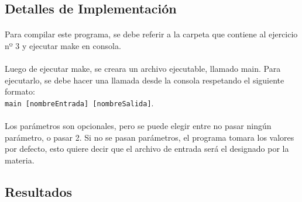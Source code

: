 \subsection{Detalles de Implementación}

\paragraph{}
Para compilar este programa, se debe referir a la carpeta que contiene al ejercicio nº 3 y ejecutar make en consola.

\paragraph{}
Luego de ejecutar make, se creara un archivo ejecutable, llamado main. Para ejecutarlo, se debe hacer una llamada desde la consola respetando el siguiente formato:\\
\texttt{main [nombreEntrada] [nombreSalida]}.

\paragraph{}
Los parámetros son opcionales, pero se puede elegir entre no pasar ningún parámetro, o pasar 2. Si no se pasan parámetros, el programa tomara los valores por defecto, esto quiere decir que el archivo de entrada será el designado por la materia.


\subsection{Resultados}
\label{resultadosej3}

